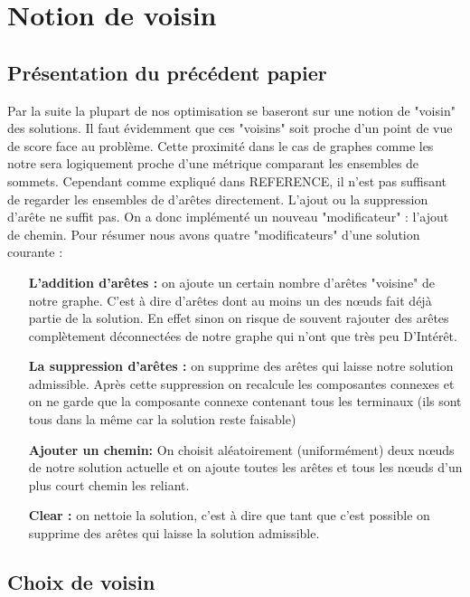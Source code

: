 \documentclass[10pt,a4paper]{article}
\begin{document}
\section{Notion de voisin}




\subsection{Présentation du précédent papier}
Par la suite la plupart de nos optimisation se baseront sur une notion de "voisin" des solutions. Il faut évidemment que ces "voisins" soit proche d'un point de vue de score face au problème. Cette proximité dans le cas de graphes comme les notre sera logiquement proche d'une métrique comparant les ensembles de sommets. Cependant comme expliqué dans REFERENCE, il n'est pas suffisant de regarder les ensembles de d’arêtes directement. L'ajout ou la suppression d’arête ne suffit pas. On a donc implémenté un nouveau "modificateur" : l'ajout de chemin. 
Pour résumer nous avons quatre "modificateurs" d'une solution courante :
\begin{itemize}   
\item[\textbf{L'addition  d’arêtes : }] on ajoute un certain nombre d'arêtes "voisine" de notre graphe. C'est à dire d'arêtes dont au moins un des nœuds fait déjà partie de la solution. En effet sinon on risque de souvent rajouter des arêtes complètement déconnectées de notre graphe qui n'ont que très peu D’Intérêt.
\item[\textbf{La suppression d’arêtes : }] on supprime des arêtes qui laisse notre solution admissible. Après cette suppression on recalcule les composantes connexes et on ne garde que la composante connexe contenant tous les terminaux (ils sont tous dans la même car la solution reste faisable) 
\item[\textbf{Ajouter un chemin: }] On choisit aléatoirement (uniformément) deux nœuds de notre solution actuelle et on ajoute toutes les arêtes et tous les nœuds d'un plus court chemin les reliant.
\item[\textbf{Clear : }] on nettoie la solution, c'est à dire que tant que c'est possible on supprime des arêtes qui laisse la solution admissible.
\end{itemize}

\subsection{Choix de voisin}
\end{document}
